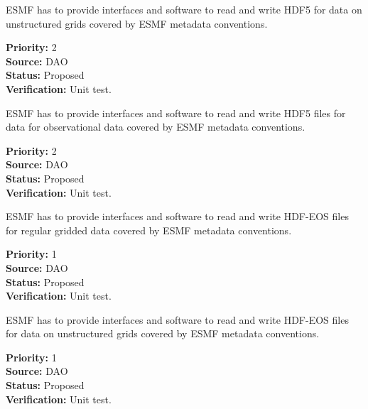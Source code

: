 
ESMF has to provide interfaces and software to read and write HDF5 for data 
on unstructured grids covered by ESMF metadata conventions.

\begin{reqlist}
{\bf Priority:} 2 \\
{\bf Source:} DAO \\
{\bf Status:} Proposed \\
{\bf Verification:} Unit test. 
\end{reqlist}



ESMF has to provide interfaces and software to read and write HDF5
files for data for observational data  covered by ESMF metadata conventions.

\begin{reqlist}
{\bf Priority:} 2 \\
{\bf Source:} DAO \\
{\bf Status:} Proposed \\
{\bf Verification:} Unit test. 
\end{reqlist}




ESMF has to provide interfaces and software to read and write HDF-EOS
files for regular gridded data covered by ESMF metadata conventions.


\begin{reqlist}
{\bf Priority:} 1 \\
{\bf Source:} DAO \\
{\bf Status:} Proposed \\
{\bf Verification:} Unit test. \\
\end{reqlist}



ESMF has to provide interfaces and software to read and write HDF-EOS
files for data on unstructured grids covered by ESMF metadata conventions.


\begin{reqlist}
{\bf Priority:} 1 \\
{\bf Source:} DAO \\
{\bf Status:} Proposed \\
{\bf Verification:} Unit test. \\
\end{reqlist}


